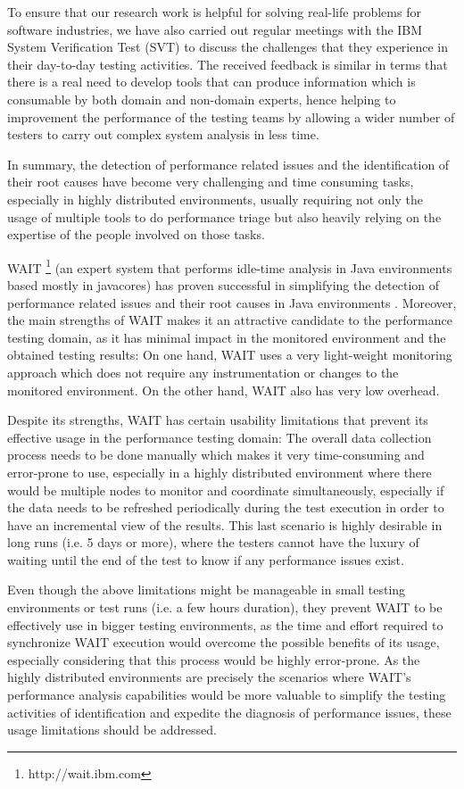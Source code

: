 \documentclass[runningheads,a4paper]{llncs}
\begin{document}
To ensure that our research work is helpful for solving real-life problems for
software industries, we have also carried out regular meetings with the IBM
System Verification Test (SVT) to discuss the challenges that they experience in
their day-to-day testing activities. The received feedback is similar in terms
that there is a real need to develop tools that can produce information which is
consumable by both domain and non-domain experts, hence helping to improvement the 
performance of the testing teams by allowing a wider number of testers to carry out 
complex system analysis in less time.

In summary, the detection of performance related issues and the identification
of their root causes have become very challenging and time consuming tasks,
especially in highly distributed environments, usually requiring not only the
usage of multiple tools to do performance triage but also heavily relying on
the expertise of the people involved on those tasks.

WAIT \footnote{http://wait.ibm.com} (an expert system that performs idle-time
analysis in Java environments based mostly in javacores) has proven successful
in simplifying the detection of performance related issues and their root causes 
in Java environments \cite{Altman2010,Wu1}. Moreover, the main strengths of WAIT
makes it an attractive candidate to the performance testing domain, as it has minimal 
impact in the monitored environment and the obtained testing results: On one
hand, WAIT uses a very light-weight monitoring approach which does not require 
any instrumentation or changes to the monitored environment. On the other hand,
WAIT also has very low overhead.

Despite its strengths, WAIT has certain usability limitations that prevent its
effective usage in the performance testing domain: The overall data collection
process needs to be done manually which makes it very time-consuming and
error-prone to use, especially in a highly distributed environment where there
would be multiple nodes to monitor and coordinate simultaneously, especially
if the data needs to be refreshed periodically during the test execution in
order to have an incremental view of the results. This last scenario is highly
desirable in long runs (i.e. 5 days or more), where the testers cannot have the
luxury of waiting until the end of the test to know if any performance issues
exist. 

Even though the above limitations might be manageable in small testing
environments or test runs (i.e. a few hours duration), they prevent WAIT to be
effectively use in bigger testing environments, as the time and effort
required to synchronize WAIT execution would overcome the possible benefits of
its usage, especially considering that this process would be highly error-prone.
As the highly distributed environments are precisely the scenarios where WAIT's
performance analysis capabilities would be more valuable to simplify the testing 
activities of identification and expedite the diagnosis of performance issues,
these usage limitations should be addressed. 
\end{document}

